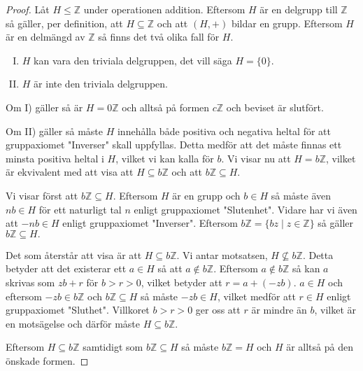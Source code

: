 \documentclass{article}
\theoremstyle{definition}
\begin{document}
\begin{proof}
  Låt $H \le \mathbb{Z}$ under operationen addition. 
  Eftersom $H$ är en delgrupp till $\mathbb{Z}$ så gäller, per definition, att 
  $H \subseteq \mathbb{Z}$ och att $(H, +)$ bildar en grupp. 
  Eftersom $H$ är en delmängd av $\mathbb{Z}$ så finns det två olika fall för $H$.
  \begin{enumerate}[I)]
    \item $H$ kan vara den triviala delgruppen, det vill säga $H = \{0\}$. 
    \item $H$ är inte den triviala delgruppen.
  \end{enumerate}
  Om I) gäller så är $H = 0 \mathbb{Z}$ och alltså på formen $c \mathbb{Z}$ och beviset är 
  slutfört.
  
  Om II) gäller så måste $H$ innehålla både positiva och negativa heltal för att 
  gruppaxiomet "Inverser" skall uppfyllas. Detta medför att det måste finnas 
  ett minsta positiva heltal i $H$, vilket vi kan kalla för $b$.
  Vi visar nu att $H = b \mathbb{Z}$, 
  vilket är ekvivalent med att visa att $H \subseteq b \mathbb{Z}$
  och att $b \mathbb{Z} \subseteq H.$

  Vi visar först att $b \mathbb{Z} \subseteq H.$   
  Eftersom $H$ är en grupp och $b \in H$ så måste 
  även $nb \in H$ för ett naturligt tal $n$ enligt gruppaxiomet "Slutenhet". 
  Vidare har vi även att $-nb \in H$ enligt gruppaxiomet "Inverser".
  Eftersom 
  $b \mathbb{Z} = \{bz \; | \; z \in \mathbb{Z}\}$ så gäller $b \mathbb{Z} \subseteq H.$

  Det som återstår att visa är att $H \subseteq b \mathbb{Z}$. Vi antar motsatsen, 
  $H \not\subseteq b \mathbb{Z}$. Detta betyder att det existerar ett 
  $a \in H$ så att $a \notin b\mathbb{Z}.$ Eftersom $a \notin b\mathbb{Z}$ så 
  kan $a$ skrivas som $zb + r$ för $b > r > 0$, vilket betyder 
  att $r = a + (-zb)$. $a \in H$ och eftersom $-zb \in b \mathbb{Z}$ och $b \mathbb{Z} \subseteq H$ 
  så måste
  $-zb \in H$, vilket medför att $r \in H$ enligt gruppaxiomet "Sluthet". Villkoret $b > r > 0$ ger oss att $r$ är mindre än $b$, vilket är en motsägelse och därför 
  måste $H \subseteq b \mathbb{Z}$.
  
  Eftersom $H \subseteq b \mathbb{Z}$ samtidigt som $b \mathbb{Z} \subseteq H$ så måste 
  $b \mathbb{Z} = H$ och $H$ är alltså på den önskade formen.
\end{proof}



\end{document}
